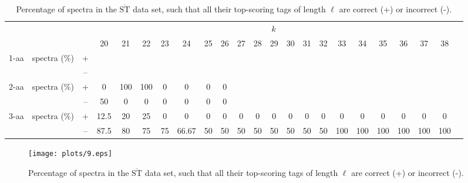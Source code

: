 \documentclass{article}
\def\STbar{{\overline{\mathrm{ST}}}}
\begin{document}
\begin{landscape}
\begin{table}[ht]
\vspace{3mm}
\end{table}
\begin{table}[ht]\tiny
\vspace{3mm}
{\centering
\begin{center}
\begin{tabular}{|c|cc|c|c|c|c|c|c|c|c|c|c|c|c|c|c|c|c|c|c|c|c|}
  \hline
  \multicolumn{3}{|c|}{ } & \multicolumn{ 19}{|c|}{$k$} \\
  \cline{4-22 }
  \multicolumn{3}{|c|}{ } 
 & 20 & 21 & 22 & 23 & 24 & 25 & 26 & 27 & 28 & 29 & 30 & 31 & 32 & 33 & 34 & 35 & 36 & 37 & 38\\
\hline
  \multirow{2}{*}{1-aa}& \multirow{2}{*}{spectra (\%)}  &  +
 &  &  &  &  &  &  &  &  &  &  &  &  &  &  &  &  &  &  & \\
 & 
 &  --
 &  &  &  &  &  &  &  &  &  &  &  &  &  &  &  &  &  &  & \\
\hline
  \multirow{2}{*}{2-aa}& \multirow{2}{*}{spectra (\%)}  &  +
 & 0 & 100 & 100 & 0 & 0 & 0 & 0 &  &  &  &  &  &  &  &  &  &  &  & \\
 & 
 &  --
 & 50 & 0 & 0 & 0 & 0 & 0 & 0 &  &  &  &  &  &  &  &  &  &  &  & \\
\hline
  \multirow{2}{*}{3-aa}& \multirow{2}{*}{spectra (\%)}  &  +
 & 12.5 & 20 & 25 & 0 & 0 & 0 & 0 & 0 & 0 & 0 & 0 & 0 & 0 & 0 & 0 & 0 & 0 & 0 & 0\\
 & 
 &  --
 & 87.5 & 80 & 75 & 75 & 66.67 & 50 & 50 & 50 & 50 & 50 & 50 & 50 & 50 & 100 & 100 & 100 & 100 & 100 & 100 \\
  \hline
\end{tabular}
\end{center}
\par}
\centering

\caption{Percentage of spectra in the $\STbar$ data set, such that all their top-scoring tags of length $\ell$ are correct (+) or incorrect (-).}
\label{table:all-top-scoring}

\vspace{3mm}
\end{table}
\end{landscape}

\begin{figure}
  \begin{center}
\texttt{[image: plots/9.eps]}

\end{center}
\caption{Percentage of spectra in the $\STbar$ data set, such that all their top-scoring tags of length $\ell$ are correct (+) or incorrect (-).}
  \label{fig:LABEL}
\end{figure}
\end{document}

